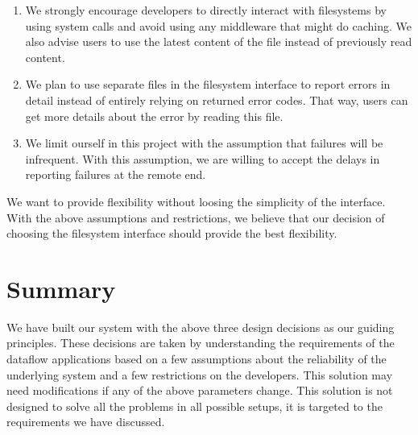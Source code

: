 \begin{enumerate}

\item We strongly encourage developers to directly interact with filesystems by
using system calls and avoid using any middleware that might do caching.  We
also advise users to use the latest content of the file instead of previously read content.

\item We plan to use separate files in the filesystem interface to report errors in
detail instead of entirely relying on returned error codes.  That way, users
can get more details about the error by reading this file.

\item We limit ourself in this project with the assumption that failures will be
infrequent.  With this assumption, we are willing to accept the delays in
reporting failures at the remote end.

\end{enumerate}

We want to provide flexibility without loosing the simplicity of the interface.
With the above assumptions and restrictions, we believe that our decision of
choosing the filesystem interface should provide the best flexibility.

\section{Summary}
We have built our system with the above three design decisions as our guiding
principles.  These decisions are taken by understanding the requirements of the
dataflow applications based on a few assumptions about the reliability of the underlying
system and a few restrictions on the developers.  This solution may need modifications
if any of the above parameters change. This solution is not designed to solve
all the problems in all possible setups, it is targeted to the requirements we
have discussed.





